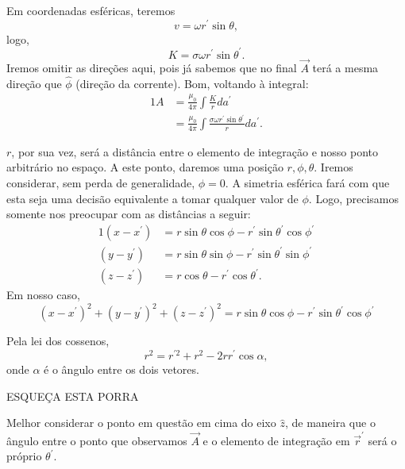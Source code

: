 \documentclass{article}
\newcommand{\rcaligrafico}{r}
\begin{document}
Em coordenadas esféricas, teremos
\begin{equation}
 v = \omega r^{\prime} \sin{\theta},
\end{equation}
logo,
\begin{equation}
 K = \sigma \omega r^{\prime} \sin{\theta^{\prime}}.
\end{equation}
Iremos omitir as direções aqui, pois já sabemos que no final $\vec{A}$ terá a mesma direção que $\hat{\phi}$ (direção da corrente). Bom, voltando à integral:
\begin{alignat}{1}
 A &= \frac{\mu_0}{4 \pi} \int \frac{K}{\rcaligrafico} da^{\prime}\\
 &= \frac{\mu_0}{4 \pi} \int \frac{\sigma \omega r^{\prime} \sin{\theta^{\prime}}}{\rcaligrafico} da^{\prime}.
\end{alignat}

$\rcaligrafico$, por sua vez, será a distância entre o elemento de integração e nosso ponto arbitrário no espaço. A este ponto, daremos uma posição $r,\phi,\theta$.
Iremos considerar, sem perda de generalidade, $\phi = 0$. A simetria esférica fará com que esta seja uma decisão equivalente a tomar qualquer valor de $\phi$.
Logo, precisamos somente nos preocupar com as distâncias a seguir:
\begin{alignat}{1}
 (x - x^{\prime}) &= r\sin{\theta}\cos{\phi} - r^{\prime}\sin{\theta^{\prime}}\cos{\phi^{\prime}}\\
 (y - y^{\prime}) &= r\sin{\theta}\sin{\phi} - r^{\prime}\sin{\theta^{\prime}}\sin{\phi^{\prime}}\\
 (z - z^{\prime}) &= r\cos{\theta} - r^{\prime}\cos{\theta^{\prime}}.
\end{alignat}
Em nosso caso,
\begin{equation}
 (x - x^{\prime})^2 + (y - y^{\prime})^2 + (z - z^{\prime})^2 = r\sin{\theta}\cos{\phi} - r^{\prime}\sin{\theta^{\prime}}\cos{\phi^{\prime}}
\end{equation}

Pela lei dos cossenos,
\begin{equation}
 \rcaligrafico^2 = r^{\prime 2} + r^{2} - 2rr^{\prime}\cos{\alpha},
\end{equation}
onde $\alpha$ é o ângulo entre os dois vetores.

ESQUEÇA ESTA PORRA

Melhor considerar o ponto em questão em cima do eixo $\hat{z}$, de maneira que o ângulo entre o ponto que observamos $\vec{A}$ e o elemento de integração em
$\vec{r}^{\prime}$ será o próprio $\theta^{\prime}$.
\end{document}
